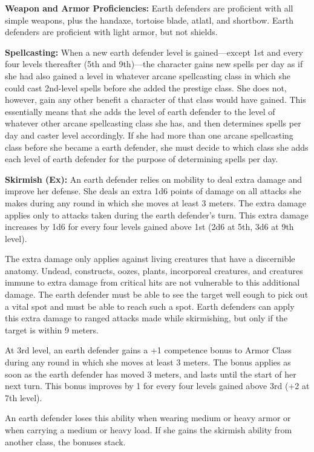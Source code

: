 {
\textbf{Weapon and Armor Proficiencies:} Earth defenders are proficient with all simple  weapons, plus the handaxe, tortoise blade, atlatl, and shortbow. Earth defenders are proficient with light armor, but not shields.

\textbf{Spellcasting:} When a new earth defender level is gained---except 1st and every four levels thereafter (5th and 9th)---the character gains new spells per day as if she had also gained a level in whatever arcane spellcasting class in which she could cast 2nd-level spells before she added the prestige class. She does not, however, gain any other benefit a character of that class would have gained. This essentially means that she adds the level of earth defender to the level of whatever other arcane spellcasting class she has, and then determines spells per day and caster level accordingly. If she had more than one arcane spellcasting class before she became a earth defender, she must decide to which class she adds each level of earth defender for the purpose of determining spells per day.


\textbf{Skirmish (Ex):} An earth defender relies on mobility to deal extra damage and improve her defense. She deals an extra 1d6 points of damage on all attacks she makes during any round in which she moves at least 3 meters. The extra damage applies only to attacks taken during the earth defender's turn. This extra damage increases by 1d6 for every four levels gained above 1st (2d6 at 5th, 3d6 at 9th level).

The extra damage only applies against living creatures that have a discernible anatomy. Undead, constructs, oozes, plants, incorporeal creatures, and creatures immune to extra damage from critical hits are not vulnerable to this additional damage. The earth defender must be able to see the target well eough to pick out a vital spot and must be able to reach such a spot. Earth defenders can apply this extra damage to ranged attacks made while skirmishing, but only if the target is within 9 meters.

At 3rd level, an earth defender gains a +1 competence bonus to Armor Class during any round in which she moves at least 3 meters. The bonus applies as soon as the earth defender has moved 3 meters, and lasts until the start of her next turn. This bonus improves by 1 for every four levels gained above 3rd (+2 at 7th level).

An earth defender loses this ability when wearing medium or heavy armor or when carrying a medium or heavy load. If she gains the skirmish ability from another class, the bonuses stack.

}

